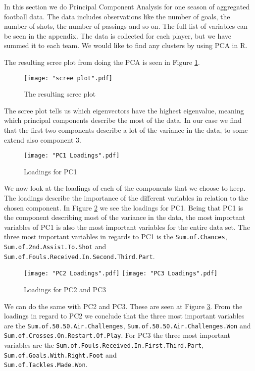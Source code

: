 \documentclass[Report.tex]{subfiles}
\begin{document}
In this section we do Principal Component Analysis for one season of aggregated football data. The data includes observations like the number of goals, the number of shots, the number of passings and so on. The full list of variables can be seen in the appendix. The data is collected for each player, but we have summed it to each team. We would like to find any clusters by using PCA in R.

The resulting scree plot from doing the PCA is seen in Figure \ref{fig:scree}.
\begin{figure}
\center
\texttt{[image: "scree plot".pdf]}
\caption{The resulting scree plot}
\label{fig:scree}
\end{figure}
The scree plot tells us which eigenvectors have the highest eigenvalue, meaning which principal components describe the most of the data. In our case we find that the first two components describe a lot of the variance in the data, to some extend also component 3. 

\begin{figure}
\center
\texttt{[image: "PC1 Loadings".pdf]}
\caption{Loadings for PC1}
\label{fig:PC1Loadings}

\end{figure}
We now look at the loadings of each of the components that we choose to keep. The loadings describe the importance of the different variables in relation to the chosen component. In Figure \ref{fig:PC1Loadings} we see the loadings for PC1. Being that PC1 is the component describing most of the variance in the data, the most important variables of PC1 is also the most important variables for the entire data set. The three most important variables in regards to PC1 is the \texttt{Sum.of.Chances}, \texttt{Sum.of.2nd.Assist.To.Shot} and \texttt{Sum.of.Fouls.Received.In.Second.Third.Part}.

\begin{figure}
\center
\texttt{[image: "PC2 Loadings".pdf]}
\texttt{[image: "PC3 Loadings".pdf]}
\caption{Loadings for PC2 and PC3}
\label{fig:PC23Loadings}
\end{figure}

We can do the same with PC2 and PC3. These are seen at Figure \ref{fig:PC23Loadings}. From the loadings in regard to PC2 we conclude that the three most important variables are the \texttt{Sum.of.50.50.Air.Challenges}, \texttt{Sum.of.50.50.Air.Challenges.Won} and\\ \texttt{Sum.of.Crosses.On.Restart.Of.Play}.
For PC3 the three most important variables are the \texttt{Sum.of.Fouls.Received.In.First.Third.Part}, \texttt{Sum.of.Goals.With.Right.Foot} and \\ \texttt{Sum.of.Tackles.Made.Won}.
\end{document}
